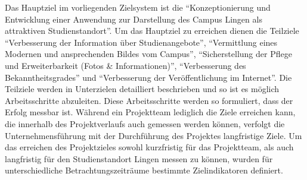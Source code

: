 Das Hauptziel im vorliegenden Zielsystem ist die "`Konzeptionierung und
Entwicklung einer Anwendung zur Darstellung des Campus Lingen als attraktiven
Studienstandort"'. Um das Hauptziel zu erreichen dienen die Teilziele
"`Verbesserung der Information über Studienangebote"', "`Vermittlung eines
Modernen und ansprechenden Bildes vom Campus"', "`Sicherstellung der Pflege und
Erweiterbarkeit (Fotos \& Informationen)"', "`Verbesserung des
Bekanntheitsgrades"' und "`Verbesserung der Veröffentlichung im Internet"'. Die
Teilziele werden in Unterzielen detailliert beschrieben und so ist es möglich
Arbeitsschritte abzuleiten. Diese Arbeitsschritte werden so formuliert, dass
der Erfolg messbar ist. Während ein Projektteam lediglich die Ziele erreichen
kann, die innerhalb des Projektverlaufs auch gemessen werden können, verfolgt
die Unternehmensführung mit der Durchführung des Projektes langfristige Ziele. 
Um das erreichen des Projektzieles sowohl kurzfristig für das Projektteam, als
auch langfristig für den Studienstandort Lingen messen zu können, wurden für
unterschiedliche Betrachtungszeiträume  bestimmte Zielindikatoren definiert.
